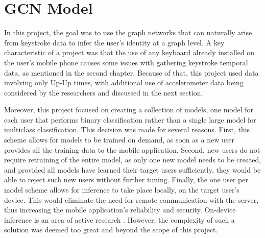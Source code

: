 \chapter{GCN Model}

In this project, the goal was to use the graph networks that can naturally arise from keystroke data to infer the user's identity at a graph level. A key characteristic of a project was that the use of any keyboard already installed on the user's mobile phone causes some issues with gathering keystroke temporal data, as mentioned in the second chapter. Because of that, this project used data involving only Up-Up times, with additional use of accelerometer data being considered by the researchers and discussed in the next section.

Moreover, this project focused on creating a collection of models, one model for each user that performs binary classification rather than a single large model for multiclass classification. This decision was made for several reasons. First, this scheme allows for models to be trained on demand, as soon as a new user provides all the training data to the mobile application. Second, new users do not require retraining of the entire model, as only one new model needs to be created, and provided all models have learned their target users sufficiently, they would be able to reject such new users without further tuning. Finally, the one user per model scheme allows for inference to take place locally, on the target user's device. This would eliminate the need for remote communication with the server, thus increasing the mobile application's reliability and security. On-device inference is an area of active research \cite{48305}. However, the complexity of such a solution was deemed too great and beyond the scope of this project.
